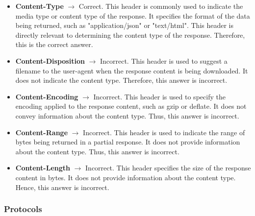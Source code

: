 \begin{itemize}
    \item \textbf{Content-Type} $\rightarrow$ Correct. This header is commonly used to indicate the media type or content type of the response. It specifies the format of the data being returned, such as "application/json" or "text/html". This header is directly relevant to determining the content type of the response. Therefore, this is the correct answer.
    \item \textbf{Content-Disposition} $\rightarrow$ Incorrect. This header is used to suggest a filename to the user-agent when the response content is being downloaded. It does not indicate the content type. Therefore, this answer is incorrect.
    \item \textbf{Content-Encoding} $\rightarrow$ Incorrect. This header is used to specify the encoding applied to the response content, such as gzip or deflate. It does not convey information about the content type. Thus, this answer is incorrect.
    \item \textbf{Content-Range} $\rightarrow$ Incorrect. This header is used to indicate the range of bytes being returned in a partial response. It does not provide information about the content type. Thus, this answer is incorrect.
    \item \textbf{Content-Length} $\rightarrow$ Incorrect. This header specifies the size of the response content in bytes. It does not provide information about the content type. Hence, this answer is incorrect.
\end{itemize}

\subsubsection{Protocols}

